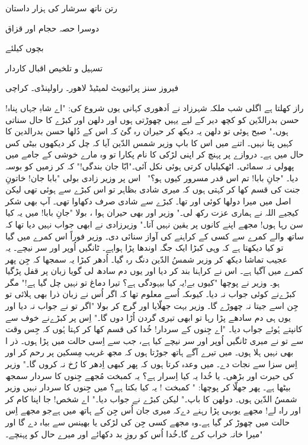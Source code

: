 ﻿رتن ناتھ سرشار کی ہزار داستان

دوسرا حصہ
حجام اور قزاق

بچوں کیلئے


تسہیل و تلخیص
اقبال کاردار



فیروز سنز پرائیویٹ لمیٹیڈ
لاھور۔ راولپنڈی۔ کراچی





راز کھلتا ہے
اگلی شب ملکہ شہرزاد نے اَدھوری کہانی یوں شروع کی:
"اے شاہِ جہاں پناہ! حسن بدرالدّین کو کچھ دیر کے لیے یہیں چھوڑتی ہوں اور دلھن اور کبڑے کا حال سناتی ہوں۔"
صبح ہوئی تو دلھن یہ دیکھ کر حیران رہ گئ کہ اس کے دُلھا حسن بدرالدین کا کہیں پتا نہیں۔ اتنے میں اس کا باپ وزیر شمس الدّین آیا کہ چل کر دیکھوں بیٹی کس حال میں ہے۔ دروازے پر پہنچ کر اپنی لڑکی کا نام پکارا تو وہ مارے خوشی کے جامے میں پھولی نہ سمائی۔ اٹھکیلیاں کرتی ہوئی نکل آئی۔"ابّا جان بندگی!" کہ کر زمیں کو بوسہ دیا۔
"جانِ بابا! تم اس قدر مسرور کیوں ہو؟"
 اس پر وزیر زادی بولی "بابا جان! خاتونِ جنت کی قسم کھا کر کہتی ہوں کہ میری شادی بظاہر تو اس کبڑے سے ہوئی تھی لیکن اصل میں میرا دولھا کوئی اور تھا۔ کبڑے سے شادی صرف دکھاوا تھی۔ آپ بھی شکر کیجیے اللہ نے ہماری عزت رکھ لی۔"
وزیر اور بھی حیران ہوا ، بولا "جانِ بابا! میں یہ کیا سن رہا ہوں! مجھے اپنے کانوں پر یقین نہیں آتا۔"
وزیرزادی نے ابھی جواب نہیں دیا تھا کہ ساتھ والے کمرے سے کسی کے کراہنے کی آواز سنائی دی۔ وزیر فوراً اس کمرے میں گیا تو کیا دیکھتا ہے کہ وہی کبڑا ایک جگہ اوندھا پڑا ہواہے۔ ٹانگیں اُوپر اور سر نیچے۔ یہ عجیب تماشا دیکھ کر وزیر شمسُ الدّین دنگ رہ گیا۔ اُدھر کبڑا یہ سمجھا کہ  جِن پھر کمرے میں آگیا ہے۔ اس نے کراہنا بند کر دیا اور یوں دم سادھ لی گویا زبان پر قفل پڑگیا ہو۔
وزیر نے پوچھا "کیوں  بے!یہ کیا بیہودگی ہے؟ تیرا دماغ تو نہیں چل گیا ہے!" مگر کبڑےنے کوئی جواب نہ دیا۔ کیوںکہ اُسے معلوم تھا کہ اگر اُس نے زبان ذرا بھی ہلائی تو جِن اسے جیتا نہ چھوڑے گا۔ وزیر بہت جھلّایا اور گرج کر بولا "اگر تو نے جواب نہ دیا اور یوں ہی دم سادھے پڑا رہا تو ابھی تیری گردن اُڑا دوں گا۔"
اِس پر کبڑےنے خوف سے کانپتے ہُوئے جواب دیا۔ "اے جِنوں کے سردار! خُدا کی قسم کھا کر کہتا ہُوں کہ جِس وقت سے تو نے میری ٹانگیں اُوپر اور سر نیچے کیا ہے، جب سے اِسی حالت میں پڑا  ہوں۔ ذر ا بھی نہیں ہلا ہوں۔ میں تیرے آگے ہاتھ جوڑتا ہوں کہ مجھ غریب مِسکین پر رحم کر اور  اِس سزا سے نجات دے۔ میں وعدہ کرتا ہوں کہ پھر کبھی اِدھر کا رُخ نہ کروں گا۔"
وزیر کی حیرت اور بڑھی۔ یا خُدا یہ کیا اِسرار ہے؟ یہ کمبخت مُجھے جِنوں کا سردار سمجھ بیٹھا ہے۔ پھر جھلّا کر پوچھا:
" کمبخت ! یہ کیا بکتا ہے؟ میں جِنوں کا سردار نہیں وزیر شمسُ الدّین ہوں۔ دولھن کا باپ۔"
لیکن کبڑے نے جواب دیا۔" اے شخص! جا اپنا کام کر اور راہ لے! مجھے یوںہی پڑا رہنے دےکہ میری جان اُس جِن کے ہاتھ میں ہےجو مجھے اِس حالت میں چھوڑ کر گیا ہے۔وہ مجھے کسی جِن کی لڑکی یا بھینس سے بیاہ دے گا اور میرا خانہ خراب کرے گا۔خُدا اُس کو روزِ بد دکھائے اور میرے حال کو پہنچے۔"
